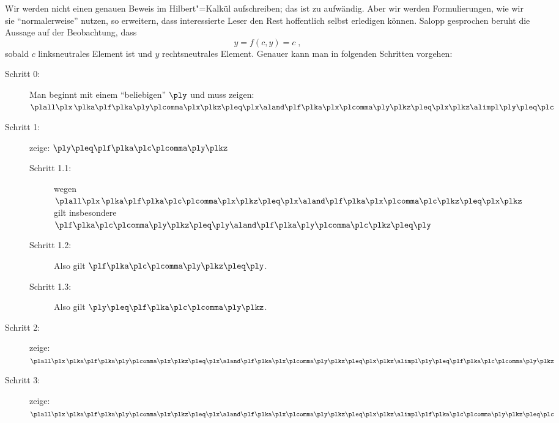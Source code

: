 Wir werden nicht einen genauen Beweis im Hilbert"=Kalkül aufschreiben;
das ist zu aufwändig.
%
Aber wir werden Formulierungen, wie wir sie "`normalerweise"' nutzen,
so erweitern, dass interessierte Leser den Rest hoffentlich selbst
erledigen können.
%
Salopp gesprochen beruht die Aussage auf der Beobachtung, dass
\[
  y = f(c,y) = c \;,
\]
sobald $c$ linksneutrales Element ist und $y$ rechtsneutrales Element.
%
Genauer kann man in folgenden Schritten vorgehen:
%
\begin{description}%
\item[Schritt 0:] Man beginnt mit einem "`beliebigen"' $\ply$ und muss zeigen: \\
  $\plall\plx\, \plka\plf\plka\ply\plcomma\plx\plkz \pleq \plx \aland
  \plf\plka\plx\plcomma\ply\plkz \pleq\plx\plkz \alimpl \ply\pleq\plc$
\item[Schritt 1:] zeige:  $\ply\pleq \plf\plka\plc\plcomma\ply\plkz  $
  \begin{description}
  \item[Schritt 1.1:] wegen
    $\plall\plx\, \plka\plf\plka\plc\plcomma\plx\plkz \pleq \plx \aland
    \plf\plka\plx\plcomma\plc\plkz \pleq\plx\plkz$ gilt insbesondere \\
    $\plf\plka\plc\plcomma\ply\plkz \pleq \ply \aland
    \plf\plka\ply\plcomma\plc\plkz \pleq\ply$
  \item[Schritt 1.2:] Also gilt $\plf\plka\plc\plcomma\ply\plkz \pleq \ply $.
  \item[Schritt 1.3:] Also gilt $\ply\pleq \plf\plka\plc\plcomma\ply\plkz  $.
  \end{description}
\item[Schritt 2:] zeige:  $\plall\plx\, \plka\plf\plka\ply\plcomma\plx\plkz \pleq \plx \aland
  \plf\plka\plx\plcomma\ply\plkz \pleq\plx\plkz \alimpl 
  \ply \pleq\plf\plka\plc\plcomma\ply\plkz $ 
\item[Schritt 3:] zeige:  $\plall\plx\, \plka\plf\plka\ply\plcomma\plx\plkz \pleq \plx \aland
  \plf\plka\plx\plcomma\ply\plkz \pleq\plx\plkz \alimpl
\plf\plka\plc\plcomma\ply\plkz \pleq\plc $
\end{description}
